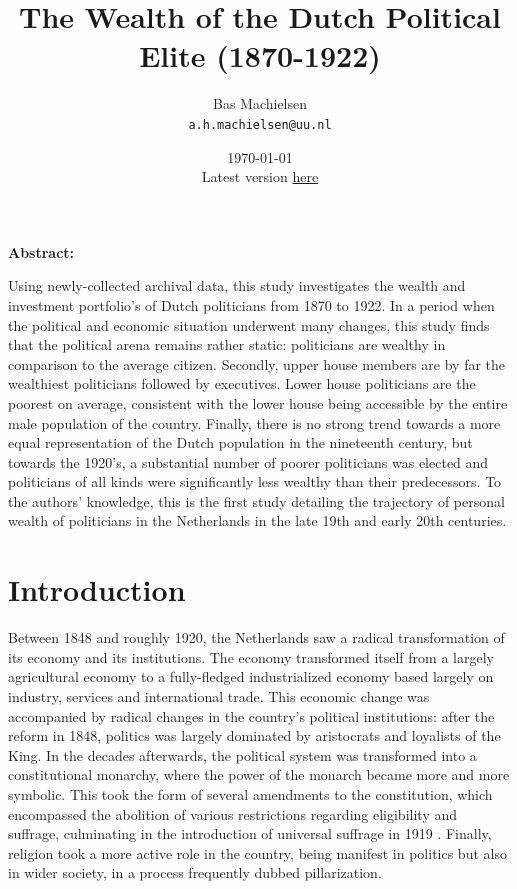 
\usepackage[utf8]{inputenc}

\title{The Wealth of the Dutch Political Elite (1870-1922)}
\author{
  Bas Machielsen\\
  \texttt{a.h.machielsen@uu.nl}
}

\date{\today \\
Latest version \href{https://bas-m.netlify.app/The_Wealth_of_Dutch_Politicians__1870_1922_.pdf}{here}}



\maketitle

\begin{center}
\textbf{Abstract:}
\end{center}
    Using newly-collected archival data, this study investigates the wealth and investment portfolio's of Dutch politicians from 1870 to 1922. In a period when the political and economic situation underwent many changes, this study finds that the political arena remains rather static: politicians are wealthy in comparison to the average citizen. Secondly, upper house members are by far the wealthiest politicians followed by executives. Lower house politicians are the poorest on average, consistent with the lower house being accessible by the entire male population of the country. Finally, there is no strong trend towards a more equal representation of the Dutch population in the nineteenth century, but towards the 1920's, a substantial number of poorer politicians was elected and politicians of all kinds were significantly less wealthy than their predecessors. To the authors' knowledge, this is the first study detailing the trajectory of personal wealth of politicians in the Netherlands in the late 19th and early 20th centuries.
\clearpage

\section{Introduction}
    
    Between 1848 and roughly 1920, the Netherlands saw a radical transformation of its economy and its institutions. The economy transformed itself from a largely agricultural economy to a fully-fledged industrialized economy based largely on industry, services and international trade.\autocite{van2004strictures} This economic change was accompanied by radical changes in the country’s political institutions: after the reform in 1848, politics was largely dominated by aristocrats and loyalists of the King. In the decades afterwards, the political system was transformed into a constitutional monarchy, where the power of the monarch became more and more symbolic. This took the form of several amendments to the constitution, which encompassed the abolition of various restrictions regarding eligibility and suffrage, culminating in the introduction of universal suffrage in 1919 \autocite{van2018tussen}. Finally, religion took a more active role in the country, being manifest in politics but also in wider society, in a process frequently dubbed pillarization. 
    
